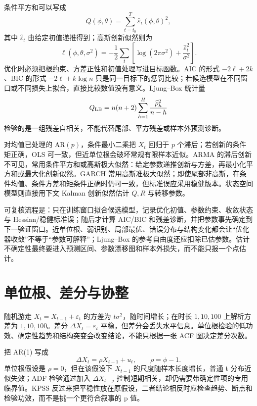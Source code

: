 
条件平方和可以写成
\[
  Q(\phi,\theta)=\sum_{t=t_0}^T
  \widehat\varepsilon_t(\phi,\theta)^2,
\]
其中 $\widehat\varepsilon_t$ 由给定初值递推得到；高斯创新似然则为
\[
 \ell(\phi,\theta,\sigma^2)
 =-\frac12\sum_t\left[
 \log(2\pi\sigma^2)+
 \frac{\widehat\varepsilon_t^2}{\sigma^2}\right].
\]
优化时必须把根约束、方差正性和初值处理写进目标函数。AIC 的形式
$-2\ell+2k$、BIC 的形式 $-2\ell+k\log n$ 只是同一目标下的惩罚比较；若候选模型在不同窗口或不同损失上拟合，直接比较数值没有意义。Ljung--Box 统计量
\[
 Q_{\rm LB}=n(n+2)\sum_{h=1}^H
 \frac{\widehat\rho_h^2}{n-h}
\]
检验的是一组残差自相关，不能代替尾部、平方残差或样本外预测诊断。


对均值已处理的 AR$(p)$，条件最小二乘把 $X_t$ 回归于 $p$ 个滞后；若创新的条件矩正确，OLS 可一致，但近单位根会破坏常规有限样本近似。ARMA 的滞后创新不可见，常用条件平方和或高斯极大似然：给定参数递推创新与方差，再最小化平方和或最大化创新似然。GARCH 常用高斯准极大似然；即使尾部非高斯，在条件均值、条件方差和矩条件正确时仍可一致，但标准误应采用稳健版本。状态空间模型则直接用下文 Kalman 创新似然估计 $Q,R$ 与转移参数。

可复核流程是：只在训练窗口拟合候选模型，记录优化初值、参数约束、收敛状态与 Hessian/稳健标准误；随后才计算 AIC/BIC 和残差诊断，并把参数事先确定到下一验证窗口。近单位根、弱识别、局部最优、错误分布与结构变化都会让“优化器收敛”不等于“参数可解释”；Ljung--Box 的参考自由度还应扣除已估参数。估计不确定性最终要进入预测区间、参数漂移图和样本外损失，而不能只报一个点估计。

\section{单位根、差分与协整}

随机游走 $X_t=X_{t-1}+\varepsilon_t$ 的方差为 $t\sigma^2$，随时间增长；在时长 $1,10,100$ 上解析方差为 $1,10,100$。差分 $\Delta X_t=\varepsilon_t$ 平稳，但差分会丢失水平信息。单位根检验的低功效、确定性趋势和结构突变会改变结论，不能只根据一张 ACF 图决定差分次数。


把 AR(1) 写成
\[
 \Delta X_t=\rho X_{t-1}+u_t,\qquad \rho=\phi-1.
\]
单位根假设是 $\rho=0$，但在该假设下 $X_{t-1}$ 的尺度随样本长度增长，普通 t 分布近似失效；ADF 检验通过加入 $\Delta X_{t-j}$ 控制短期相关，却仍需要带确定性项的专用临界值。KPSS 反过来把平稳性放在原假设，二者结论相反时应检查趋势、断点和检验功效，而不是挑一个更符合叙事的 p 值。

